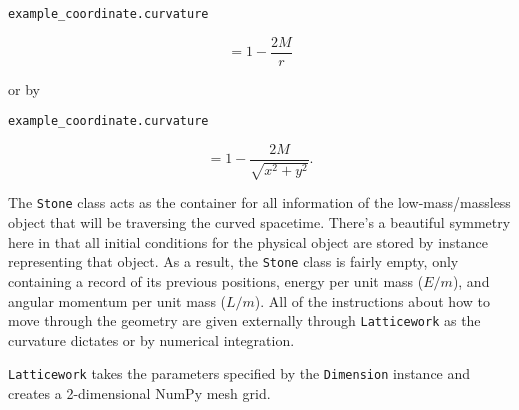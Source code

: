\documentclass[
]{article}
\begin{document}
\begin{minipage}{0.15\textwidth}
    \raggedright
    \begin{verbatim}example_coordinate.curvature\end{verbatim}
\end{minipage}
\begin{minipage}{0.8\textwidth}
    \begin{equation}
        = 1-\frac{2M}{r}
    \end{equation}
\end{minipage}

or by

\begin{minipage}{0.15\textwidth}
    \raggedright
    \begin{verbatim}example_coordinate.curvature\end{verbatim}
\end{minipage}
\begin{minipage}{0.8\textwidth}
    \begin{equation}
        = 1-\frac{2M}{\sqrt{x^2 + y^2}}.
    \end{equation}
\end{minipage}

The \texttt{Stone} class acts as the container for all information of
the low-mass/massless object that will be traversing the curved
spacetime. There's a beautiful symmetry here in that all initial
conditions for the physical object are stored by instance representing
that object. As a result, the \texttt{Stone} class is fairly empty, only
containing a record of its previous positions, energy per unit mass
(\(E/m\)), and angular momentum per unit mass (\(L/m\)). All of the
instructions about how to move through the geometry are given externally
through \texttt{Latticework} as the curvature dictates or by numerical
integration.

\texttt{Latticework} takes the parameters specified by the
\texttt{Dimension} instance and creates a 2-dimensional NumPy mesh grid.
\end{document}
